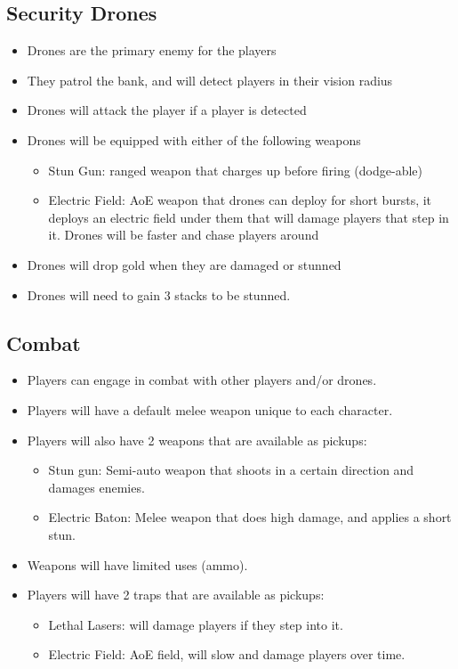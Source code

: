 \documentclass[14pt]{report}
\begin{document}
\subsection{Security Drones}
\begin{itemize}
    \item Drones are the primary enemy for the players
    \item They patrol the bank, and will detect players in their vision radius
    \item Drones will attack the player if a player is detected
    \item Drones will be equipped with either of the following weapons
    \begin{itemize}
        \item Stun Gun: ranged weapon that charges up before firing (dodge-able)
        \item Electric Field: AoE weapon that drones can deploy for short bursts, it deploys an electric field under them that will damage players that step in it. Drones will be faster and chase players around
    \end{itemize}
    \item Drones will drop gold when they are damaged or stunned
    \item Drones will need to gain 3 stacks to be stunned.
\end{itemize}

\subsection{Combat}
\begin{itemize}
    \item Players can engage in combat with other players and/or drones.
    \item Players will have a default melee weapon unique to each character.
    \item Players will also have 2 weapons that are available as pickups:
    \begin{itemize}
        \item Stun gun: Semi-auto weapon that shoots in a certain direction and damages enemies.
        \item Electric Baton: Melee weapon that does high damage, and applies a short stun.
    \end{itemize}
    \item Weapons will have limited uses (ammo).
    \item Players will have 2 traps that are available as pickups:
    \begin{itemize}
        \item Lethal Lasers: will damage players if they step into it.
        \item Electric Field: AoE field, will slow and damage players over time.
    \end{itemize}
\end{itemize}
\end{document}
